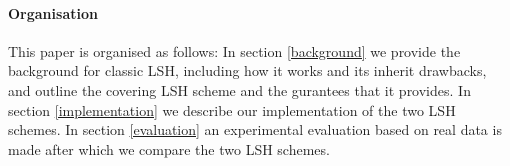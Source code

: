 \paragraph{Organisation} This paper is organised as follows: In section \ref{background} we provide the background for classic LSH, including how it works and its inherit drawbacks, and outline the covering LSH scheme and the gurantees that it provides. In section \ref{implementation} we describe our implementation of the two LSH schemes. In section \ref{evaluation} an experimental evaluation based on real data is made after which we compare the two LSH schemes.

